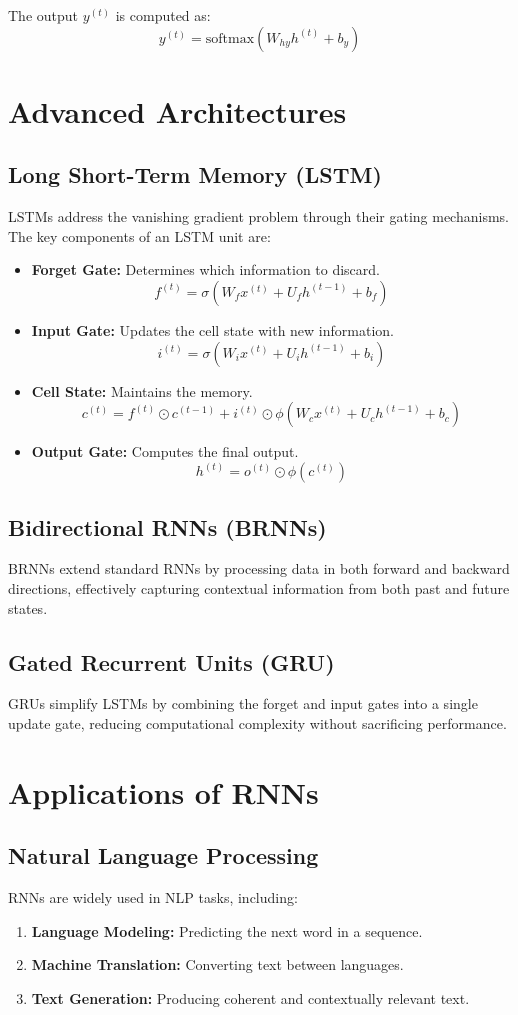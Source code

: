 The output \( y^{(t)} \) is computed as:
\[
y^{(t)} = \text{softmax}(W_{hy} h^{(t)} + b_y)
\]

\section{Advanced Architectures}
\subsection{Long Short-Term Memory (LSTM)}
LSTMs address the vanishing gradient problem through their gating mechanisms. The key components of an LSTM unit are:
\begin{itemize}
    \item \textbf{Forget Gate:} Determines which information to discard.
    \[
    f^{(t)} = \sigma(W_f x^{(t)} + U_f h^{(t-1)} + b_f)
    \]
    \item \textbf{Input Gate:} Updates the cell state with new information.
    \[
    i^{(t)} = \sigma(W_i x^{(t)} + U_i h^{(t-1)} + b_i)
    \]
    \item \textbf{Cell State:} Maintains the memory.
    \[
    c^{(t)} = f^{(t)} \odot c^{(t-1)} + i^{(t)} \odot \phi(W_c x^{(t)} + U_c h^{(t-1)} + b_c)
    \]
    \item \textbf{Output Gate:} Computes the final output.
    \[
    h^{(t)} = o^{(t)} \odot \phi(c^{(t)})
    \]
\end{itemize}

\subsection{Bidirectional RNNs (BRNNs)}
BRNNs extend standard RNNs by processing data in both forward and backward directions, effectively capturing contextual information from both past and future states.

\subsection{Gated Recurrent Units (GRU)}
GRUs simplify LSTMs by combining the forget and input gates into a single update gate, reducing computational complexity without sacrificing performance.

\section{Applications of RNNs}
\subsection{Natural Language Processing}
RNNs are widely used in NLP tasks, including:
\begin{enumerate}
    \item \textbf{Language Modeling:} Predicting the next word in a sequence.
    \item \textbf{Machine Translation:} Converting text between languages.
    \item \textbf{Text Generation:} Producing coherent and contextually relevant text.
\end{enumerate}

